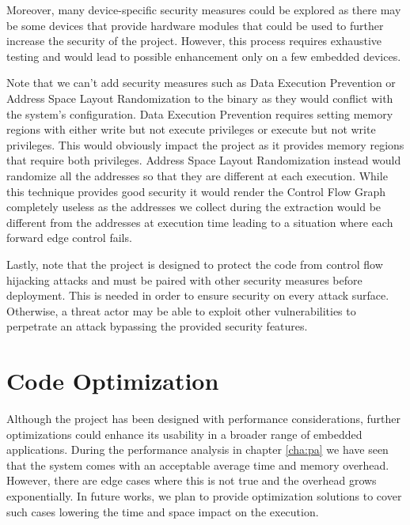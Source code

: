 Moreover, many device-specific security measures could be explored as there may
be some devices that provide hardware modules that could be used to further
increase the security of the project. However, this process requires exhaustive
testing and would lead to possible enhancement only on a few embedded devices.

Note that we can't add security measures such as Data Execution Prevention or
Address Space Layout Randomization to the binary as they would conflict with the
system's configuration. Data Execution Prevention requires setting memory regions
with either write but not execute privileges or execute but not write privileges.
This would obviously impact the project as it provides memory regions that
require both privileges. Address Space Layout Randomization instead would randomize
all the addresses so that they are different at each execution. While this
technique provides good security it would render the Control Flow Graph
completely useless as the addresses we collect during the extraction would be
different from the addresses at execution time leading to a situation where each
forward edge control fails.

Lastly, note that the project is designed to protect the code from control flow hijacking
attacks and must be paired with other security measures before deployment. This
is needed in order to ensure security on every attack surface. Otherwise, a
threat actor may be able to exploit other vulnerabilities to perpetrate an
attack bypassing the provided security features.

\section{Code Optimization}
\label{sec:future_optimization}

Although the project has been designed with performance considerations, further
optimizations could enhance its usability in a broader range of embedded
applications. During the performance analysis in chapter \ref{cha:pa} we have seen
that the system comes with an acceptable average time and memory overhead.
However, there are edge cases where this is not true and the overhead grows exponentially.
In future works, we plan to provide optimization solutions to cover such cases lowering
the time and space impact on the execution.

